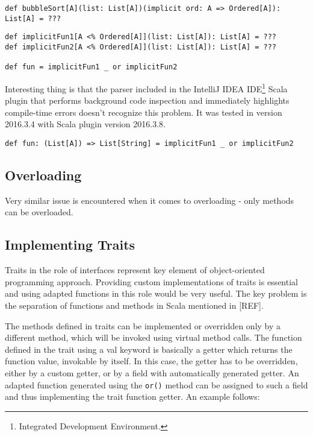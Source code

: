 \lstset{style=Scala}
\begin{lstlisting}
def bubbleSort[A](list: List[A])(implicit ord: A => Ordered[A]): List[A] = ???
\end{lstlisting}

\lstset{style=Scala}
\begin{lstlisting}
def implicitFun1[A <% Ordered[A]](list: List[A]): List[A] = ???
def implicitFun2[A <% Ordered[A]](list: List[A]): List[A] = ???

def fun = implicitFun1 _ or implicitFun2
\end{lstlisting}

Interesting thing is that the parser included in the IntelliJ IDEA IDE\footnote{Integrated Development Environment.} Scala plugin that performs background code inspection and immediately highlights compile-time errors doesn't recognize this problem. It was tested in version 2016.3.4 with Scala plugin version 2016.3.8.


\lstset{style=Scala}
\begin{lstlisting}
def fun: (List[A]) => List[String] = implicitFun1 _ or implicitFun2
\end{lstlisting}


\subsection{Overloading}
Very similar issue is encountered when it comes to overloading - only methods can be overloaded.

\subsection{Implementing Traits}
Traits in the role of interfaces represent key element of object-oriented programming approach. Providing custom implementations of traits is essential and using adapted functions in this role would be very useful. The key problem is the separation of functions and methods in Scala mentioned in [REF].

The methods defined in traits can be implemented or overridden only by a different method, which will be invoked using virtual method calls. The function defined in the trait using a val keyword is basically a getter which returns the function value, invokable by itself. In this case, the getter has to be overridden, either by a custom getter, or by a field with automatically generated getter. An adapted function generated using the \lstinline|or()| method can be assigned to such a field and thus implementing the trait function getter. An example follows:

